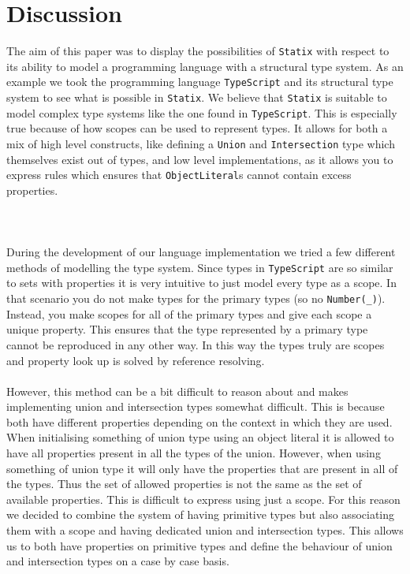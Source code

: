 \documentclass{article}
\newcommand{\ttt}[1]{\texttt{#1}}
\begin{document}
\section{Discussion} \label{sec:discussion}
The aim of this paper was to display the possibilities of \ttt{Statix} with respect to its ability to model a programming language with a structural type system.
As an example we took the programming language \ttt{TypeScript} and its structural type system to see what is possible in \ttt{Statix}.
We believe that \ttt{Statix} is suitable to model complex type systems like the one found in \ttt{TypeScript}.
This is especially true because of how scopes can be used to represent types.
It allows for both a mix of high level constructs, like defining a \ttt{Union} and \ttt{Intersection} type which themselves exist out of types, and low level implementations, as it allows you to express rules which ensures that \ttt{ObjectLiteral}s cannot contain excess properties.
\\\\\\\\
During the development of our language implementation we tried a few different methods of modelling the type system.
Since types in \ttt{TypeScript} are so similar to sets with properties it is very intuitive to just model every type as a scope.
In that scenario you do not make types for the primary types (so no \ttt{Number(\_)}).
Instead, you make scopes for all of the primary types and give each scope a unique property.
This ensures that the type represented by a primary type cannot be reproduced in any other way.
In this way the types truly are scopes and property look up is solved by reference resolving.
\\\\
However, this method can be a bit difficult to reason about and makes implementing union and intersection types somewhat difficult.
This is because both have different properties depending on the context in which they are used.
When initialising something of union type using an object literal it is allowed to have all properties present in all the types of the union.
However, when using something of union type it will only have the properties that are present in all of the types.
Thus the set of allowed properties is not the same as the set of available properties.
This is difficult to express using just a scope.
For this reason we decided to combine the system of having primitive types but also associating them with a scope and having dedicated union and intersection types.
This allows us to both have properties on primitive types and define the behaviour of union and intersection types on a case by case basis.



\end{document}
